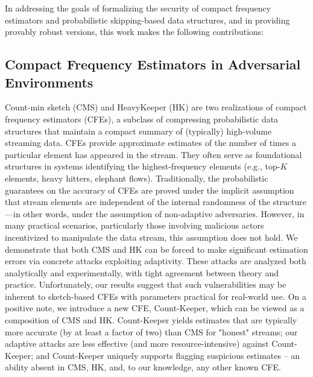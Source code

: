 In addressing the goals of formalizing the security of compact frequency estimators and probabilistic skipping-based data structures, and in providing provably robust versions, this work makes the following contributions:

\subsection{Compact Frequency Estimators in Adversarial Environments} Count-min sketch (CMS) and HeavyKeeper (HK) are two realizations of compact frequency estimators (CFEs), a subclass of compressing probabilistic data structures that maintain a compact summary of (typically) high-volume streaming data. CFEs provide approximate estimates of the number of times a particular element has appeared in the stream. They often serve as foundational structures in systems identifying the highest-frequency elements (e.g., top-$K$ elements, heavy hitters, elephant flows). Traditionally, the probabilistic guarantees on the accuracy of CFEs are proved under the implicit assumption that stream elements are independent of the internal randomness of the structure—in other words, under the assumption of non-adaptive adversaries. However, in many practical scenarios, particularly those involving malicious actors incentivized to manipulate the data stream, this assumption does not hold. We demonstrate that both CMS and HK can be forced to make significant estimation errors via concrete attacks exploiting adaptivity. These attacks are analyzed both analytically and experimentally, with tight agreement between theory and practice. Unfortunately, our results suggest that such vulnerabilities may be inherent to sketch-based CFEs with parameters practical for real-world use. On a positive note, we introduce a new CFE, Count-Keeper, which can be viewed as a composition of CMS and HK. Count-Keeper yields estimates that are typically more accurate (by at least a factor of two) than CMS for "honest" streams; our adaptive attacks are less effective (and more resource-intensive) against Count-Keeper; and Count-Keeper uniquely supports flagging suspicious estimates -- an ability absent in CMS, HK, and, to our knowledge, any other known CFE.

